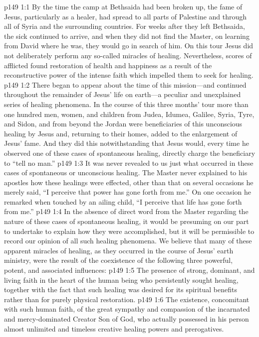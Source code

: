 \vs p149 1:1 By the time the camp at Bethsaida had been broken up, the fame of Jesus, particularly as a healer, had spread to all parts of Palestine and through all of Syria and the surrounding countries. For weeks after they left Bethsaida, the sick continued to arrive, and when they did not find the Master, on learning from David where he was, they would go in search of him. On this tour Jesus did not deliberately perform any so\hyp{}called miracles of healing. Nevertheless, scores of afflicted found restoration of health and happiness as a result of the reconstructive power of the intense faith which impelled them to seek for healing.
\vs p149 1:2 There began to appear about the time of this mission---and continued throughout the remainder of Jesus’ life on earth---a peculiar and unexplained series of healing phenomena. In the course of this three months’ tour more than one hundred men, women, and children from Judea, Idumea, Galilee, Syria, Tyre, and Sidon, and from beyond the Jordan were beneficiaries of this unconscious healing by Jesus and, returning to their homes, added to the enlargement of Jesus’ fame. And they did this notwithstanding that Jesus would, every time he observed one of these cases of spontaneous healing, directly charge the beneficiary to \textcolor{ubdarkred}{“tell no man.”}
\pc \vs p149 1:3 It was never revealed to us just what occurred in these cases of spontaneous or unconscious healing. The Master never explained to his apostles how these healings were effected, other than that on several occasions he merely said, \textcolor{ubdarkred}{“I perceive that power has gone forth from me.”} On one occasion he remarked when touched by an ailing child, “I perceive that life has gone forth from me.”\plusone
\vs p149 1:4 In the absence of direct word from the Master regarding the nature of these cases of spontaneous healing, it would be presuming on our part to undertake to explain how they were accomplished, but it will be permissible to record our opinion of all such healing phenomena. We believe that many of these apparent miracles of healing, as they occurred in the course of Jesus’ earth ministry, were the result of the coexistence of the following three powerful, potent, and associated influences:
\pc \vs p149 1:5 \bibnobreakspace The presence of strong, dominant, and living faith in the heart of the human being who persistently sought healing, together with the fact that such healing was desired for its spiritual benefits rather than for purely physical restoration.
\pc \vs p149 1:6 \bibnobreakspace The existence, concomitant with such human faith, of the great sympathy and compassion of the incarnated and mercy\hyp{}dominated Creator Son of God, who actually possessed in his person almost unlimited and timeless creative healing powers and prerogatives.
